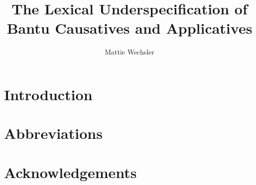 \documentclass[output=paper,modfonts,nonflat]{langsci/langscibook}
\author{Mattie Wechsler\affiliation{}}
\title{The Lexical Underspecification of Bantu Causatives and Applicatives}
\begin{document}
\section{Introduction}  
 
\section*{Abbreviations}
\section*{Acknowledgements}

\sloppy
\printbibliography[heading=subbibliography,notkeyword=this] 
\end{document}
